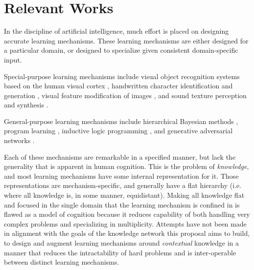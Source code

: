 \documentclass[11pt,letterpaper]{article}
\begin{document}
\section{Relevant Works}

In the discipline of artificial intelligence, much effort is placed on
designing accurate learning mechanisms. These learning mechanisms are
either designed for a particular domain, or designed to specialize
given consistent domain-specific input.

Special-purpose learning mechanisms include visual object recognition
systems based on the human visual cortex \cite{serre07}, handwritten
character identification and generation \cite{lake15}, visual feature
modification of images \cite{kulkarni15}, and sound texture perception and
synthesis \cite{mcdermott11}.

General-purpose learning mechanisms include hierarchical Bayesian methods
\cite{tenenbaum01}, program learning \cite{liang10}\cite{dechter13},
inductive logic programming \cite{lavrac94}\cite{muggleton15}, and
generative adversarial networks \cite{goodfellow14}.

Each of these mechanisms are remarkable in a specified manner, but lack the
generality that is apparent in human cognition. This is the problem of
\emph{knowledge}, and most learning mechanisms have some internal
representation for it. Those representations are mechanism-specific, and
generally have a flat hierarchy (i.e. where all knowledge is, in some
manner, equidistant). Making all knowledge flat and focused in the single
domain that the learning mechanism is confined in is flawed as a model of
cognition because it reduces capability of both handling very complex
problems and specializing in multiplicity. Attempts have not been made in
alignment with the goals of the knowledge network this proposal aims to
build, to design and augment learning mechanisms around \emph{contextual}
knowledge in a manner that reduces the intractability of hard problems and
is inter-operable between distinct learning mechanisms.
\end{document}
